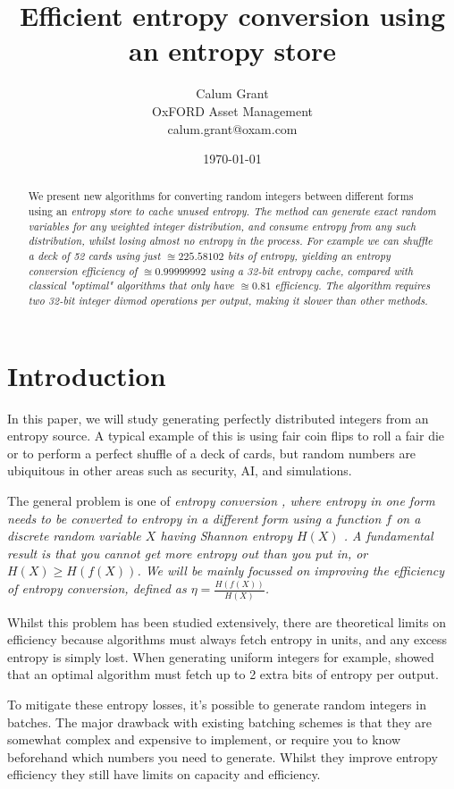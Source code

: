 \documentclass[12pt]{article}
\title{Efficient entropy conversion using an entropy store}
\author{Calum Grant \\
OxFORD Asset Management \\
calum.grant@oxam.com}
\date{\today}
\begin{document}
\maketitle

\begin{abstract}
    We present new algorithms for converting random integers between different forms using an \em entropy store \em to cache unused entropy. The method can generate exact random variables for any weighted integer distribution, and consume entropy from any such distribution, whilst losing almost no entropy in the process.  For example we can shuffle a deck of 52 cards using just $\approxeq 225.58102$ bits of entropy, yielding an entropy conversion efficiency of $\approxeq 0.99999992$ using a 32-bit entropy cache, compared with classical "optimal" algorithms that only have $\approxeq 0.81$ efficiency.  The algorithm requires two 32-bit integer divmod operations per output, making it slower than other methods.
\end{abstract}

\section{Introduction}

In this paper, we will study generating perfectly distributed integers from an entropy source. A typical example of this is using fair coin flips to roll a fair die or to perform a perfect shuffle of a deck of cards, but random numbers are ubiquitous in other areas such as security, AI, and simulations.

The general problem is one of \em entropy conversion \em, where entropy in one form needs to be converted to entropy in a different form using a function $f$ on a discrete random variable $X$ having Shannon entropy $H(X)$ \cite{shannon1948mathematical}.  A fundamental result is that you cannot get more entropy out than you put in, or $H(X) \ge H(f(X))$. We will be mainly focussed on improving the \em efficiency \em of entropy conversion, defined as $\eta = \frac{H(f(X))}{H(X)}$.

Whilst this problem has been studied extensively, there are theoretical limits on efficiency because algorithms must always fetch entropy in units, and any excess entropy is simply lost. When generating uniform integers for example, \cite{Knuth1976TheCO} showed that an optimal algorithm must fetch up to 2 extra bits of entropy per output.

To mitigate these entropy losses, it's possible to generate random integers in batches. The major drawback with existing batching schemes is that they are somewhat complex and expensive to implement, or require you to know beforehand which numbers you need to generate. Whilst they improve entropy efficiency they still have limits on capacity and efficiency.
\end{document}
